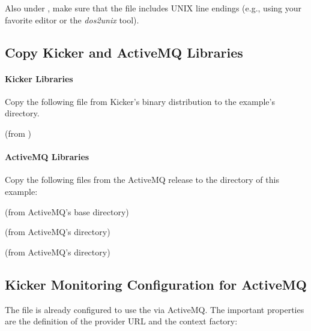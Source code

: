 \noindent Also under \UnixLikeSystems{}, make sure that the file  %
includes UNIX line endings (e.g., using your favorite editor or the \textit{dos2unix} tool).

\subsection{Copy Kicker and ActiveMQ Libraries}

\paragraph*{Kicker Libraries}

Copy the following file from Kicker's binary distribution to %
the example's  directory.

\enlargethispage{0.5cm}
\medskip

\begin{compactenum}
 \item \file{\mainJarEMF} (from )
\end{compactenum}

\paragraph*{ActiveMQ Libraries}

Copy the following files from the ActiveMQ release to the %
 directory of this example:

\medskip

\begin{compactenum}
\item {} (from ActiveMQ's base directory)
\item {} (from ActiveMQ's  directory)
\item {} (from ActiveMQ's  directory)
\end{compactenum}

\subsection{Kicker Monitoring Configuration for ActiveMQ}

The file  %
is already configured to use the  via ActiveMQ. The important properties are %
the definition of the provider URL and the context factory:

